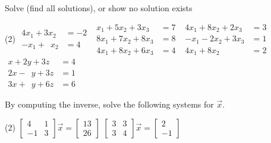 \begin{exercise}
\pagebreak[2]
Solve (find all solutions), or show no solution exists
\begin{tasks}(2)
\task
$\begin{aligned}
 4x_1+3x_2 & = -2 \\
 -x_1+\phantom{3} x_2 & = 4
\end{aligned}$
\task
$\begin{aligned}
  x_1+5x_2+3x_3 & = 7 \\
 8x_1+7x_2+8x_3 & = 8 \\
 4x_1+8x_2+6x_3 & = 4
\end{aligned}$
\task
$\begin{aligned}
 4x_1+8x_2+2x_3 & = 3 \\
 -x_1-2x_2+3x_3 & = 1 \\
 4x_1+8x_2 \phantom{{}+3x_3} & = 2
\end{aligned}$
\task
$\begin{aligned}
  x+2y+3z & = 4 \\
2  x-\phantom{2} y+3z & = 1 \\
3  x+\phantom{2} y+6z & = 6
\end{aligned}$
\end{tasks}
\end{exercise}

\begin{exercise}
By computing the inverse,
solve the following systems for $\vec{x}$.
\begin{tasks}(2)
\task
$\begin{bmatrix}
4 & 1 \\
-1 & 3
\end{bmatrix} \vec{x} =
\begin{bmatrix} 13 \\ 26 \end{bmatrix}$
\task
$\begin{bmatrix}
3 & 3 \\
3 & 4
\end{bmatrix} \vec{x} =
\begin{bmatrix} 2 \\ -1 \end{bmatrix}$
\end{tasks}
\end{exercise}

